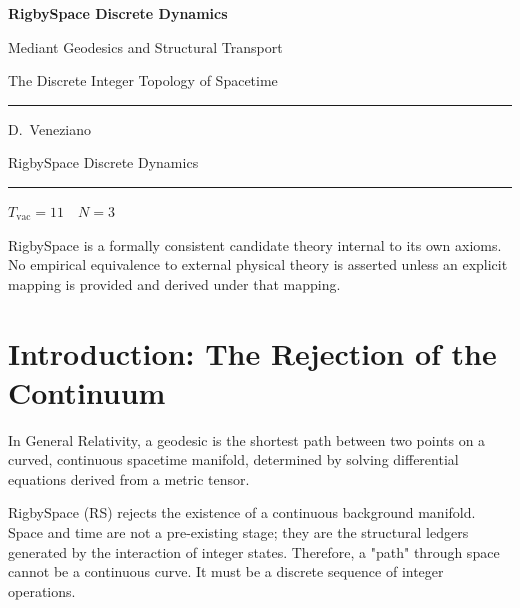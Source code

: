 \documentclass[11pt, letterpaper]{article}
\newcommand{\Tvac}{T_{\mathrm{vac}}}
\begin{document}
\begin{titlepage}
  \centering
  \vspace*{2cm}
  {\Huge\bfseries\color{RSblue} RigbySpace Discrete Dynamics\par}
  \vspace{0.5cm}
  {\LARGE Mediant Geodesics and Structural Transport\par}
  \vspace{0.5cm}
  {\large The Discrete Integer Topology of Spacetime\par}
  \vspace{2cm}
  \rule{0.6\textwidth}{0.4pt}\par
  \vspace{1cm}
  {\large D.\ Veneziano\par}
  \vspace{0.8cm}
  {\normalsize RigbySpace Discrete Dynamics\par}
  \vspace{1.5cm}
  \rule{0.6\textwidth}{0.4pt}\par
  \vspace{0.5cm}
  {\small $\Tvac = 11 \quad N = 3$ \par}
  \vfill
  {\small\color{RSgray}
  RigbySpace is a formally consistent candidate theory internal to its own
  axioms. No empirical equivalence to external physical theory is asserted
  unless an explicit mapping is provided and derived under that mapping.\par}
\end{titlepage}

\tableofcontents
\newpage

\section{Introduction: The Rejection of the Continuum}

In General Relativity, a geodesic is the shortest path between two points on a curved, continuous spacetime manifold, determined by solving differential equations derived from a metric tensor. 

RigbySpace (RS) rejects the existence of a continuous background manifold. Space and time are not a pre-existing stage; they are the structural ledgers generated by the interaction of integer states. Therefore, a "path" through space cannot be a continuous curve. It must be a discrete sequence of integer operations.
\end{document}
